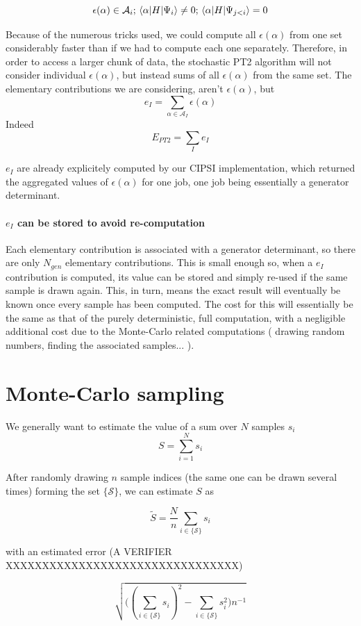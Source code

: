 \documentclass[./thesis.tex]{subfiles}
\begin{document}
	$$\epsilon(\alpha) \in \mathcal{A}_i ; \mel{\alpha}{H}{\Psi_i} \neq 0 ; \mel{\alpha}{H}{\Psi_{j<i}} =0 $$

Because of the numerous tricks used, we could compute all $\epsilon(\alpha)$ from one set considerably faster than if we had to compute each one separately. Therefore, in order to access a larger chunk of data, the stochastic PT2 algorithm will not consider individual $\epsilon(\alpha)$, but instead sums of all $\epsilon(\alpha)$ from the same set.
The elementary contributions we are considering, aren't $\epsilon(\alpha)$, but
	$$e_I = \sum_{\alpha \in \mathcal{A}_I} \epsilon(\alpha)$$
Indeed
    $$E_{PT2} = \sum_{I} e_I$$

$e_I$ are already explicitely computed by our CIPSI implementation, which returned the aggregated values of $\epsilon(\alpha)$ for one job, one job being essentially a generator determinant.

\paragraph{$e_I$ can be stored to avoid re-computation}
Each elementary contribution is associated with a generator determinant, so there are only $N_{gen}$ elementary contributions. This is small enough so, when a $e_I$ contribution is computed, its value can be stored and simply re-used if the same sample is drawn again. This, in turn, means the exact result will eventually be known once every sample has been computed. The cost for this will essentially be the same as that of the purely deterministic, full computation, with a negligible additional cost due to the Monte-Carlo related computations ( drawing random numbers, finding the associated samples... ).

\section{Monte-Carlo sampling}

We generally want to estimate the value of a sum over $N$ samples $s_i$
$$S = \sum_{i=1}^N {s_i}$$

After randomly drawing $n$ sample indices (the same one can be drawn several times) forming the set $\{\mathcal{S}\}$, we can estimate $S$ as

$$\tilde S = \frac{N}{n} \sum_{i \in \{\mathcal{S}\}} {s_i}$$

with an estimated error (A VERIFIER XXXXXXXXXXXXXXXXXXXXXXXXXXXXXXXX)

$$\sqrt{ \Big ((\sum_{i \in \{\mathcal{S}\}} {s_i})^2 - \sum_{i \in \{\mathcal{S}\}} {s^2_i} \Big )n^{-1} }$$
\end{document}
